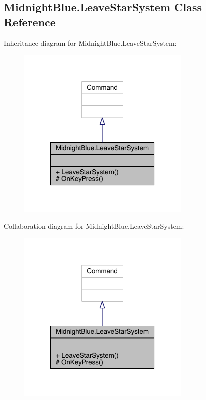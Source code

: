 \hypertarget{class_midnight_blue_1_1_leave_star_system}{}\subsection{Midnight\+Blue.\+Leave\+Star\+System Class Reference}
\label{class_midnight_blue_1_1_leave_star_system}


Inheritance diagram for Midnight\+Blue.\+Leave\+Star\+System\+:\nopagebreak
\begin{figure}[H]
\begin{center}
\leavevmode
\includegraphics[width=236pt]{class_midnight_blue_1_1_leave_star_system__inherit__graph}
\end{center}
\end{figure}


Collaboration diagram for Midnight\+Blue.\+Leave\+Star\+System\+:\nopagebreak
\begin{figure}[H]
\begin{center}
\leavevmode
\includegraphics[width=236pt]{class_midnight_blue_1_1_leave_star_system__coll__graph}
\end{center}
\end{figure}

